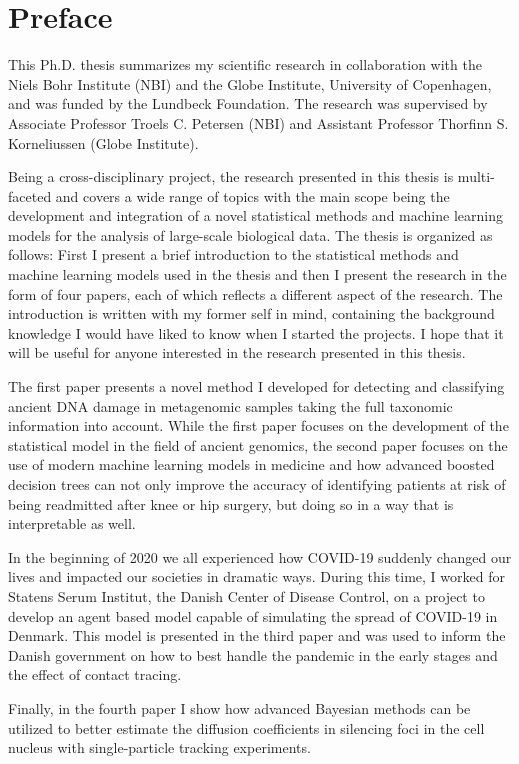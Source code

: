 \chapter{Preface}
This Ph.D. thesis summarizes my scientific research in collaboration with the Niels Bohr Institute (NBI) and the Globe Institute, University of Copenhagen, and was funded by the Lundbeck Foundation. The research was supervised by Associate Professor Troels C. Petersen (NBI) and Assistant Professor Thorfinn S. Korneliussen (Globe Institute).

Being a cross-disciplinary project, the research presented in this thesis is multi-faceted and covers a wide range of topics with the main scope being the development and integration of a novel statistical methods and machine learning models for the analysis of large-scale biological data. The thesis is organized as follows: First I present a brief introduction to the statistical methods and machine learning models used in the thesis and then I present the research in the form of four papers, each of which reflects a different aspect of the research. The introduction is written with my former self in mind, containing the background knowledge I would have liked to know when I started the projects. I hope that it will be useful for anyone interested in the research presented in this thesis.

The first paper presents a novel method I developed for detecting and classifying ancient DNA damage in metagenomic samples taking the full taxonomic information into account. While the first paper focuses on the development of the statistical model in the field of ancient genomics, the second paper focuses on the use of modern machine learning models in medicine and how advanced boosted decision trees can not only improve the accuracy of identifying patients at risk of being readmitted after knee or hip surgery, but doing so in a way that is interpretable as well.

In the beginning of 2020 we all experienced how COVID-19 suddenly changed our lives and impacted our societies in dramatic ways. During this time, I worked for Statens Serum Institut, the Danish Center of Disease Control, on a project to develop an agent based model capable of simulating the spread of COVID-19 in Denmark. This model is presented in the third paper and was used to inform the Danish government on how to best handle the pandemic in the early stages and the effect of contact tracing.

Finally, in the fourth paper I show how advanced Bayesian methods can be utilized to better estimate the diffusion coefficients in silencing foci in the cell nucleus with single-particle tracking experiments.